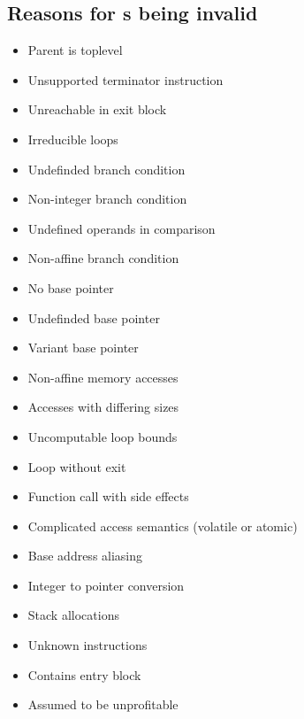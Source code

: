 \subsection{Reasons for \scop s being invalid}
\begin{itemize}
    \item Parent is toplevel
        
    \item Unsupported terminator instruction
    \item Unreachable in exit block
        
    \item Irreducible loops
        
    \item Undefinded branch condition
    \item Non-integer branch condition
    \item Undefined operands in comparison
    \item Non-affine branch condition
    \item No base pointer
    \item Undefinded base pointer
    \item Variant base pointer
        
    \item Non-affine memory accesses
        
    \item Accesses with differing sizes
    \item Uncomputable loop bounds
        
    \item Loop without exit
        
    \item Function call with side effects
        
    \item Complicated access semantics (volatile or atomic)
    \item Base address aliasing
        
    \item Integer to pointer conversion
        
    \item Stack allocations
    \item Unknown instructions
    \item Contains entry block
    \item Assumed to be unprofitable
        
\end{itemize}

